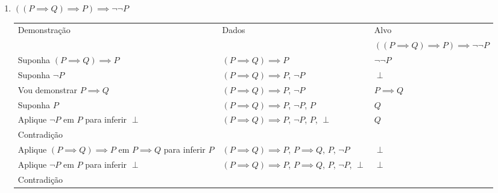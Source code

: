 \documentclass[a4paper, 12pt]{article}
\begin{document}
\begin{enumerate}
\begin{enumerate}[1.]
        \item $((P \implies Q) \implies P) \implies \neg\neg P$
        \begin{table}[h!]
            \centering
            \begin{tabular}{|p{4cm} | p{4cm} | p{4cm} |}
            \rowcolor{gray!50}
            Demonstração & Dados & Alvo \\
            & & $((P \implies Q) \implies P) \implies \neg \neg P$\\
            Suponha $(P \implies Q) \implies P$ & $(P \implies Q) \implies P$ & $\neg \neg P$\\
            Suponha $\neg P$ & $(P \implies Q) \implies P$, $\neg P$ & $\perp$ \\
            \rowcolor{red!25}
            Vou demonstrar $P \implies Q$ & $(P \implies Q) \implies P$, $\neg P$ & $P \implies Q$\\
            \rowcolor{red!25}
            Suponha $P$ & $(P \implies Q) \implies P$, $\neg P$, $P$ & $Q$ \\
            \rowcolor{red!25}
            Aplique $\neg P$ em $P$ para inferir $\perp$ & $(P \implies Q) \implies P$, $\neg P$, $P$, $\perp$ & $Q$\\
            \rowcolor{red!25}
            Contradição & & \\
            Aplique $(P \implies Q) \implies P$ em $P \implies Q$ para inferir $P$ & $(P \implies Q) \implies P$, $P \implies Q$, $P$, $\neg P$ & $\perp$\\
            Aplique $\neg P$ em $P$ para inferir $\perp$ & $(P \implies Q) \implies P$, $P \implies Q$, $P$, $\neg P$, $\perp$ & $\perp$\\
            Contradição & & \\
            \hline
            \end{tabular}
        \end{table}
    \end{enumerate}


\end{enumerate}
\end{document}
